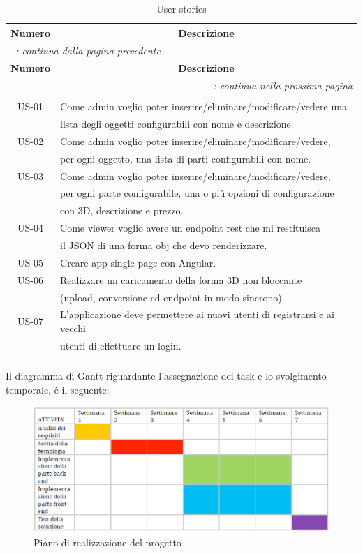 \begin{longtable}{|c|l|}
	\hline
	\multicolumn{1}{|c|}{\textbf{Numero}} & \multicolumn{1}{c|}{\textbf{Descrizione}} \\
	\endfirsthead
	\multicolumn{2}{l}{\footnotesize\itshape\tablename~\thetable:
		continua dalla pagina precedente} \\
	\hline
	\multicolumn{1}{|c|}{\textbf{Numero}} & \multicolumn{1}{c|}{\textbf{Descrizione}} \\
	\endhead
	\multicolumn{2}{r}{\footnotesize\itshape\tablename~\thetable:
		continua nella prossima pagina} \\
	\endfoot
	\multicolumn{2}{r}{} \\
	\endlastfoot
	\hline
	US-01 & Come admin voglio poter inserire/eliminare/modificare/vedere una\\
	& lista degli oggetti configurabili con nome e descrizione.\\
	\hline
	US-02 & Come admin voglio poter inserire/eliminare/modificare/vedere,\\  & per ogni oggetto, una lista di parti configurabili con nome.\\
	\hline
	US-03 & Come admin voglio poter inserire/eliminare/modificare/vedere,\\  & per ogni parte configurabile, una o più opzioni di configurazione\\ & con 3D, descrizione e prezzo.\\
	\hline
	US-04 & Come viewer voglio avere un endpoint rest che mi restituisca\\   & il JSON di una forma obj che devo renderizzare.\\
	\hline
	US-05 & Creare app single-page con Angular.\\
	\hline
	US-06 & Realizzare un caricamento della forma 3D non bloccante\\ & (upload, conversione ed endpoint in modo sincrono).\\
	\hline
	US-07 & L'applicazione deve permettere ai nuovi utenti di registrarsi e ai vecchi\\ & utenti di effettuare un login.\\
	\hline
	\caption{User stories}
	\label{tab:user:sto} \\
\end{longtable} 

Il diagramma di Gantt riguardante l'assegnazione dei task e lo svolgimento temporale, è il seguente:
\begin{figure}[h]
	\centering
	\includegraphics[scale=0.7]{Immagini/piano_realizzazione_progetto.png}
	\caption{Piano di realizzazione del progetto}
\end{figure}